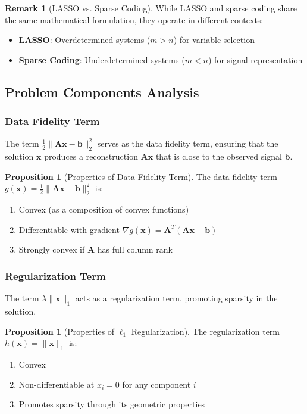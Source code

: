 \documentclass[12pt]{article}
\renewcommand{\vec}[1]{\mathbf{#1}}
\newcommand{\norm}[1]{\lVert#1\rVert}
\theoremstyle{definition}
\newtheorem{proposition}[theorem]{Proposition}
\newtheorem{remark}[theorem]{Remark}
\begin{document}
\begin{remark}[LASSO vs. Sparse Coding]
    While LASSO and sparse coding share the same mathematical formulation, they operate in different contexts:
    \begin{itemize}
        \item \textbf{LASSO}: Overdetermined systems ($m > n$) for variable selection
        \item \textbf{Sparse Coding}: Underdetermined systems ($m < n$) for signal representation
    \end{itemize}
\end{remark}

\subsection{Problem Components Analysis}

\subsubsection{Data Fidelity Term}

The term $\frac{1}{2}\norm{\mathbf{A}\vec{x} - \vec{b}}_2^2$ serves as the data fidelity term, ensuring that the solution $\vec{x}$ produces a reconstruction $\mathbf{A}\vec{x}$ that is close to the observed signal $\vec{b}$.

\begin{proposition}[Properties of Data Fidelity Term]
    The data fidelity term $g(\vec{x}) = \frac{1}{2}\norm{\mathbf{A}\vec{x} - \vec{b}}_2^2$ is:
    \begin{enumerate}
        \item Convex (as a composition of convex functions)
        \item Differentiable with gradient $\nabla g(\vec{x}) = \mathbf{A}^T(\mathbf{A}\vec{x} - \vec{b})$
        \item Strongly convex if $\mathbf{A}$ has full column rank
    \end{enumerate}
\end{proposition}

\subsubsection{Regularization Term}

The term $\lambda \norm{\vec{x}}_1$ acts as a regularization term, promoting sparsity in the solution.

\begin{proposition}[Properties of $\ell_1$ Regularization]
    The regularization term $h(\vec{x}) = \norm{\vec{x}}_1$ is:
    \begin{enumerate}
        \item Convex
        \item Non-differentiable at $x_i = 0$ for any component $i$
        \item Promotes sparsity through its geometric properties
    \end{enumerate}
\end{proposition}
\end{document}
